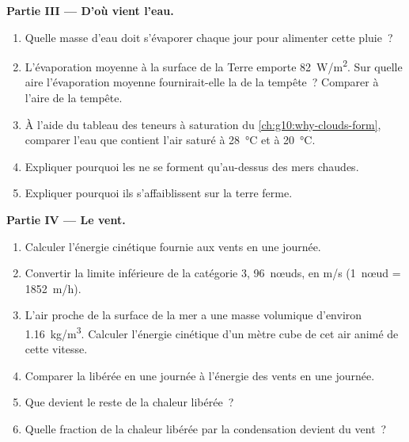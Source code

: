 \begin{problem}
\medskip
\noindent\textbf{Partie III --- D'où vient l'eau.}
\begin{enumerate}[resume]
  \item Quelle masse d'eau doit s'évaporer chaque jour pour alimenter cette
        pluie~?
  \item L'évaporation moyenne à la surface de la Terre emporte
        \qty{82}{W/m^2}. Sur quelle aire l'évaporation moyenne fournirait-elle
        la  de la tempête~? Comparer à l'aire de la tempête.
  \item À l'aide du tableau des teneurs à saturation du
        \cref{ch:g10:why-clouds-form}, comparer l'eau que contient l'air
        saturé à \qty{28}{\degreeCelsius} et à \qty{20}{\degreeCelsius}.
  \item Expliquer pourquoi les  ne se forment qu'au-dessus
        des mers chaudes.
  \item Expliquer pourquoi ils s'affaiblissent sur la terre ferme.
\end{enumerate}

\medskip
\noindent\textbf{Partie IV --- Le vent.}
\begin{enumerate}[resume]
  \item Calculer l'énergie cinétique fournie aux vents en une journée.
  \item Convertir la limite inférieure de la catégorie 3, \num{96}~nœuds,
        en \unit{m/s} (\num{1}~nœud = \qty{1852}{m/h}).
  \item L'air proche de la surface de la mer a une masse volumique d'environ
        \qty{1.16}{kg/m^3}. Calculer l'énergie cinétique d'un mètre cube de
        cet air animé de cette vitesse.
  \item Comparer la  libérée en une journée à l'énergie des
        vents en une journée.
  \item Que devient le reste de la chaleur libérée~?
  \item Quelle fraction de la chaleur libérée par la condensation devient
        du vent~?
\end{enumerate}
\end{problem}
